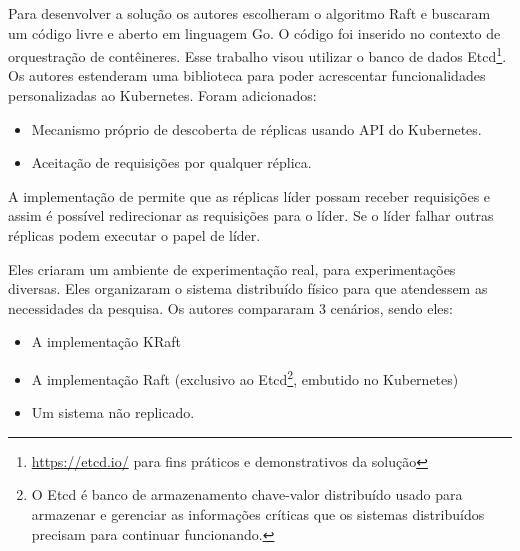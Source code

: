 
Para desenvolver a solução os autores escolheram o algoritmo Raft e buscaram um código livre e aberto em linguagem Go. O código foi inserido no contexto de orquestração de contêineres. Esse trabalho visou utilizar o banco de dados Etcd\footnote{\url{https://etcd.io/} para fins práticos e demonstrativos da solução}. Os autores estenderam uma biblioteca para poder acrescentar funcionalidades personalizadas ao Kubernetes. Foram adicionados:

\begin{itemize}
\item Mecanismo próprio de descoberta de réplicas usando API do Kubernetes.
\item Aceitação de requisições por qualquer réplica.
\end{itemize}


A implementação de \textcite{netto2020incorporating} permite que as réplicas líder possam receber requisições e assim é possível redirecionar as requisições para o líder. Se o líder falhar outras réplicas podem executar o papel de líder.


Eles criaram um ambiente de experimentação real, para experimentações diversas. Eles organizaram o sistema distribuído físico para que atendessem as necessidades da pesquisa. Os autores compararam 3 cenários, sendo eles:

\begin{itemize}
\item A implementação KRaft
\item A implementação Raft (exclusivo ao Etcd\footnote{O Etcd é banco de armazenamento chave-valor distribuído usado para armazenar e gerenciar as informações críticas que os sistemas distribuídos precisam para continuar funcionando.}, embutido no Kubernetes)
\item Um sistema não replicado.
\end{itemize}

